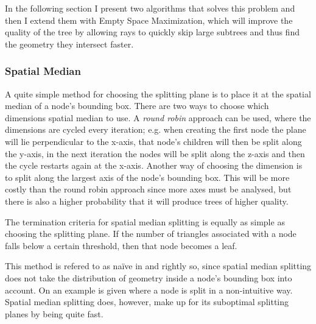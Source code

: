 
In the following section I present two algorithms that solves this problem and
then I extend them with Empty Space Maximization, which will improve the quality
of the tree by allowing rays to quickly skip large subtrees and thus find the
geometry they intersect faster.


\subsubsection{Spatial Median}



A quite simple method for choosing the splitting plane is to place it at the
spatial median of a node's bounding box. There are two ways to choose which
dimensions spatial median to use. A \textit{round robin} approach can be used,
where the dimensions are cycled every iteration; e.g. when creating the first
node the plane will lie perpendicular to the x-axis, that node's children will
then be split along the y-axis, in the next iteration the nodes will be split
along the z-axis and then the cycle restarts again at the x-axis. Another way of
choosing the dimension is to split along the largest axis of the node's bounding
box. This will be more costly than the round robin approach since more axes must
be analysed, but there is also a higher probability that it will produce trees
of higher quality.

The termination criteria for spatial median splitting is equally as simple as
choosing the splitting plane. If the number of triangles associated with a node
falls below a certain threshold, then that node becomes a leaf.


This method is refered to as naïve in  and rightly so,
since spatial median splitting does not take the distribution of geometry inside
a node's bounding box into account. On  an example is
given where a node is split in a non-intuitive way. Spatial median splitting
does, however, make up for its suboptimal splitting planes by being quite fast.


